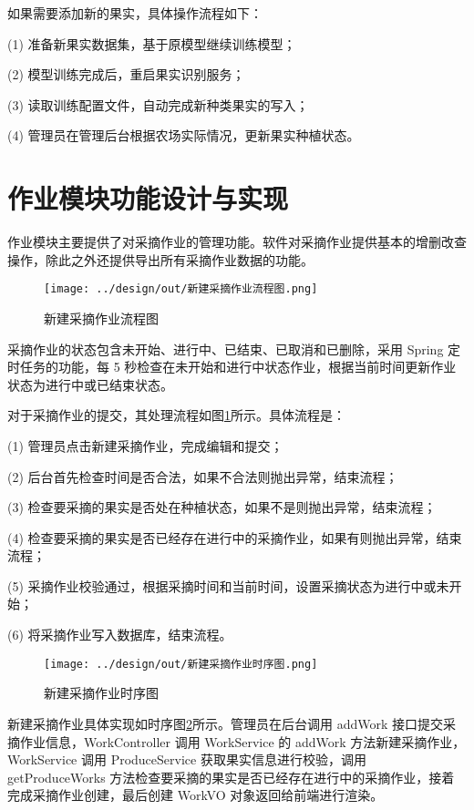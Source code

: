 如果需要添加新的果实，具体操作流程如下：

(1) 准备新果实数据集，基于原模型继续训练模型；

(2) 模型训练完成后，重启果实识别服务；

(3) 读取训练配置文件，自动完成新种类果实的写入；

(4) 管理员在管理后台根据农场实际情况，更新果实种植状态。

\section{作业模块功能设计与实现}\label{sec:work-mode}

作业模块主要提供了对采摘作业的管理功能。软件对采摘作业提供基本的增删改查操作，除此之外还提供导出所有采摘作业数据的功能。

\begin{figure}
    \centering
    \texttt{[image: ../design/out/新建采摘作业流程图.png]}
    \caption{新建采摘作业流程图}
    \label{fig:新建采摘作业流程图}
\end{figure}

采摘作业的状态包含未开始、进行中、已结束、已取消和已删除，采用 Spring 定时任务的功能，每 5 秒检查在未开始和进行中状态作业，根据当前时间更新作业状态为进行中或已结束状态。

对于采摘作业的提交，其处理流程如图\ref{fig:新建采摘作业流程图}所示。具体流程是：

(1) 管理员点击新建采摘作业，完成编辑和提交；

(2) 后台首先检查时间是否合法，如果不合法则抛出异常，结束流程；

(3) 检查要采摘的果实是否处在种植状态，如果不是则抛出异常，结束流程；

(4) 检查要采摘的果实是否已经存在进行中的采摘作业，如果有则抛出异常，结束流程；

(5) 采摘作业校验通过，根据采摘时间和当前时间，设置采摘状态为进行中或未开始；

(6) 将采摘作业写入数据库，结束流程。

\begin{figure}
    \centering
    \texttt{[image: ../design/out/新建采摘作业时序图.png]}
    \caption{新建采摘作业时序图}
    \label{fig:新建采摘作业时序图}
\end{figure}

新建采摘作业具体实现如时序图\ref{fig:新建采摘作业时序图}所示。管理员在后台调用 addWork 接口提交采摘作业信息，WorkController 调用 WorkService 的 addWork 方法新建采摘作业，WorkService 调用 ProduceService 获取果实信息进行校验，调用 getProduceWorks 方法检查要采摘的果实是否已经存在进行中的采摘作业，接着完成采摘作业创建，最后创建 WorkVO 对象返回给前端进行渲染。

